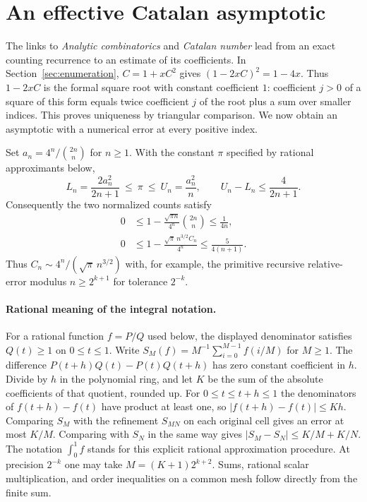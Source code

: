 \section{An effective Catalan asymptotic}
\label{sec:analytic-catalan}
The links to \emph{Analytic combinatorics} and \emph{Catalan number}
lead from an exact counting recurrence to an estimate of its coefficients.
In Section~\ref{sec:enumeration}, $C=1+xC^2$ gives
$(1-2xC)^2=1-4x$. Thus $1-2xC$ is the formal square root with
constant coefficient $1$: coefficient $j>0$ of a square of this form
equals twice coefficient $j$ of the root plus a sum over smaller indices.
This proves uniqueness by triangular comparison. We now obtain an
asymptotic with a numerical error at every positive index.

\begin{theorem}\label{result14}
Set $a_n=4^n/\binom{2n}{n}$ for $n\ge1$. With the constant $\pi$
specified by rational approximants below,
\[
 L_n=\frac{2a_n^2}{2n+1}\ \le\ \pi\ \le\
 U_n=\frac{a_n^2}{n},\qquad U_n-L_n\le\frac4{2n+1}.
\]
Consequently the two normalized counts satisfy
\[
\begin{split}
 0&\le 1-\frac{\sqrt{\pi n}}{4^n}\binom{2n}{n}\le\frac1{4n},\\
 0&\le 1-\frac{\sqrt{\pi}\,n^{3/2}C_n}{4^n}
       \le\frac5{4(n+1)}.
\end{split}
\]
Thus $C_n\sim 4^n/(\sqrt{\pi}\,n^{3/2})$ with, for example, the
primitive recursive relative-error modulus $n\ge 2^{k+1}$ for tolerance
$2^{-k}$.
\end{theorem}

\paragraph{Rational meaning of the integral notation.}
For a rational function $f=P/Q$ used below, the displayed denominator
satisfies $Q(t)\ge1$ on $0\le t\le1$. Write
$S_M(f)=M^{-1}\sum_{i=0}^{M-1} f(i/M)$ for $M\ge1$.
The difference $P(t+h)Q(t)-P(t)Q(t+h)$ has zero constant coefficient
in $h$. Divide by $h$ in the polynomial ring, and let $K$ be the
sum of the absolute coefficients of that quotient, rounded up.
For $0\le t\le t+h\le1$ the denominators of $f(t+h)-f(t)$ have
product at least one, so $|f(t+h)-f(t)|\le Kh$.
Comparing $S_M$ with the refinement $S_{MN}$ on each original cell
gives an error at most $K/M$. Comparing with $S_N$ in the same way gives
$|S_M-S_N|\le K/M+K/N$. The notation $\int_0^1 f$ stands for this
explicit rational approximation procedure. At precision $2^{-k}$ one
may take $M=(K+1)2^{k+2}$. Sums, rational scalar multiplication, and
order inequalities on a common mesh follow directly from the finite sum.

